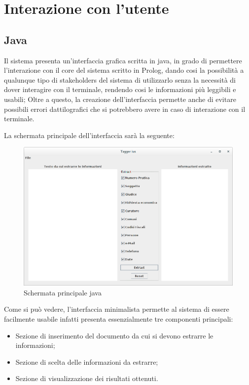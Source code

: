 \section{Interazione con l'utente}
\subsection{Java}
Il sistema presenta un'interfaccia grafica scritta in java, in grado di permettere l'interazione con il core del sistema scritto in Prolog, dando cosi la possibilità a qualunque tipo di stakeholders del sistema di utilizzarlo senza la necessità di dover interagire con il terminale, rendendo cosi le informazioni più leggibili e usabili; Oltre a questo, la creazione dell'interfaccia permette anche di evitare possibili errori dattilografici che si potrebbero avere in caso di interazione con il terminale.

La schermata principale dell'interfaccia sarà la seguente:
\begin{figure}[H]
	\includegraphics[width=1\textwidth]{img/interfaces/java-main.png}
	\caption[Schermata java main]{Schermata principale java}
	\label{java-main}
\end{figure}

Come si può vedere, l'interfaccia minimalista permette al sistema di essere facilmente usabile infatti presenta essenzialmente tre componenti principali:
\begin{itemize}
  \item Sezione di inserimento del documento da cui si devono estrarre le informazioni;
  \item Sezione di scelta delle informazioni da estrarre;
  \item Sezione di visualizzazione dei risultati ottenuti.
\end{itemize}

